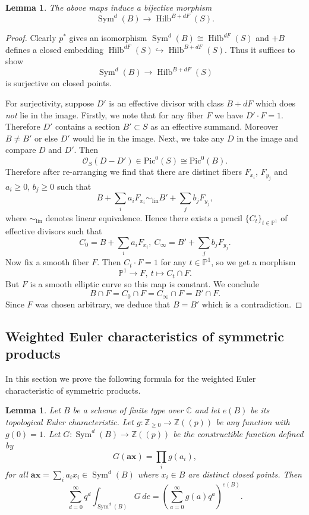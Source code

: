 \documentclass[12pt]{amsart}
\newtheorem{lemma}[theorem]{Lemma}
\theoremstyle{definition}
\newcommand{\CC} {\mathbb{C}}          %
\newcommand{\ZZ} {\mathbb{Z}}		%
\newcommand{\PP} {\mathbb{P}}
\renewcommand{\O}{\mathcal{O}}
\newcommand{\Pic}{\mathrm{Pic}}
\newcommand{\Sym}{\operatorname{Sym}}
\newcommand{\Hilb}{\operatorname{Hilb}}
\newcommand{\boldx}{\boldsymbol{x}}
\newcommand{\bolda}{\boldsymbol{a}}
\begin{document}
\begin{lemma} \label{lem: Sym(B) = Hilb(S)}
The above maps induce a bijective morphism
$$
\Sym^d(B) \to  \Hilb^{B+dF}(S).
$$
\end{lemma}

\begin{proof}
Clearly $p^*$ gives an isomorphism $\Sym^d(B) \cong \Hilb^{dF}(S)$ and
$+B$ defines a closed embedding $\Hilb^{dF}(S) \hookrightarrow
\Hilb^{B+dF}(S)$. Thus it suffices
to show
$$
\Sym^d(B) \rightarrow \Hilb^{B+dF}(S)
$$ 
is surjective on closed points.

For surjectivity, suppose $D'$ is an effective divisor with class
$B+dF$ which does \emph{not} lie in the image. Firstly, we note that
for any fiber $F$ we have $D' \cdot F = 1$. Therefore $D'$ contains a
section $B' \subset S$ as an effective summand. Moreover $B \neq B'$
or else $D'$ would lie in the image. Next, we take any $D$ in the
image and compare $D$ and $D'$. Then
$$
\O_S(D-D') \in \Pic^0(S) \cong \Pic^0(B).
$$ 
Therefore after re-arranging we find that there are distinct fibers $F_{x_i}$, $F_{y_j}$ and $a_i \geq 0$, $b_j \geq 0$ such that 
$$
B + \sum_i a_i F_{x_i} \sim_{\mathrm{lin}} B' + \sum_j b_j F_{y_j},
$$
where $\sim_{\mathrm{lin}}$ denotes linear equivalence. Hence there exists a pencil $\{C_t \}_{t \in \PP^1}$ of effective divisors such that
$$
C_0 = B + \sum_i a_i F_{x_i}, \ C_{\infty} = B' + \sum_j b_j F_{y_j}.
$$
Now fix a smooth fiber $F$. Then $C_t \cdot F = 1$ for any $t \in \PP^1$, so we get a morphism
$$
\PP^1 \longrightarrow F, \ t \mapsto C_t \cap F.
$$
But $F$ is a smooth elliptic curve so this map is constant. We conclude
$$
B \cap F = C_0 \cap F = C_{\infty} \cap F = B' \cap F.
$$
Since $F$ was chosen arbitrary, we deduce that $B = B'$ which is a contradiction.
\end{proof}


\subsection{Weighted Euler characteristics of symmetric products} \label{power}

In this section we prove the following formula for the weighted Euler
characteristic of symmetric products.

\begin{lemma}\label{lem: formula for euler char of sym products}
Let $B$ be a scheme of finite type over $\CC $ and let $e (B)$ be its
topological Euler characteristic. Let $g:\ZZ _{\geq 0}\to \ZZ
(\!(p)\!)$ be any function with $g (0)=1$. Let $G:\Sym ^{d} (B)\to \ZZ
(\!(p)\!)$ be the constructible function defined by
\[
G (\bolda \boldx )=\prod _{i}g (a_{i}),
\]
for all $\bolda \boldx  = \sum_{i}
a_{i}x_{i} \in \Sym^d(B)$ where $x_i \in B$ are distinct closed points. Then
\[
\sum _{d=0}^{\infty } q^{d} \int _{\Sym ^{d} (B)} G \, de =
\left(\sum _{a=0}^{\infty }g (a) q^{a} \right)^{e (B)}.
\]
\end{lemma}
\end{document}
